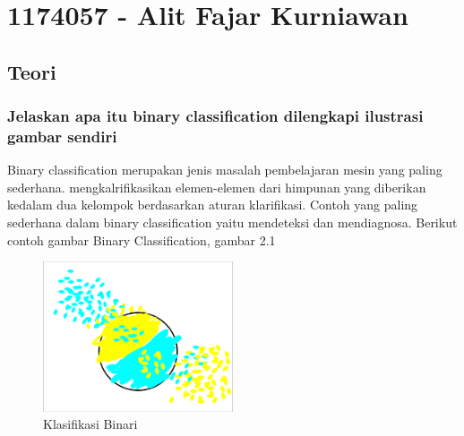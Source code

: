 \section{1174057 - Alit Fajar Kurniawan}
\subsection{Teori}
	\subsubsection{Jelaskan apa itu binary classiﬁcation dilengkapi ilustrasi gambar sendiri}
	\par Binary classiﬁcation merupakan jenis masalah pembelajaran mesin yang paling sederhana.
	mengkalriﬁkasikan elemen-elemen dari himpunan yang diberikan kedalam dua kelompok berdasarkan aturan klariﬁkasi. Contoh yang paling sederhana dalam binary classification yaitu mendeteksi dan mendiagnosa. Berikut contoh gambar Binary Classification, gambar 2.1
		\begin{figure}[H]
			\centering
			\includegraphics[width=0.5\textwidth]{figures/1174057/chapter2/1.jpg}
			\caption{Klasifikasi Binari}
			\label{print}
		\end{figure}

